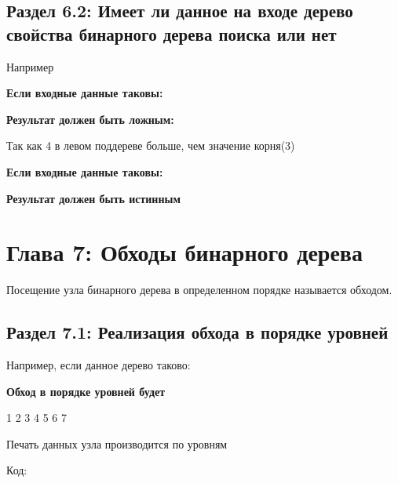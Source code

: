 
\section*{Раздел 6.2: Имеет ли данное на входе дерево свойства \newline бинарного дерева поиска или нет}

Например

\vspace{\baselineskip}
\textbf{Если входные данные таковы:}

\vspace{\baselineskip}
\vspace{-0.3cm}

\textbf{Результат должен быть ложным:}

\vspace{\baselineskip}
Так как 4 в левом поддереве больше, чем значение корня(3)

\vspace{\baselineskip}
\textbf{Если входные данные таковы:}


\vspace{-0.5cm}
\textbf{Результат должен быть истинным}

\chapter*{Глава 7: Обходы бинарного дерева}
\vspace{-0.3cm}
Посещение узла бинарного дерева в определенном порядке называется обходом.

\vspace{\baselineskip}
\vspace{-0.4cm}
\section*{Раздел 7.1: Реализация обхода в порядке уровней}
Например, если данное дерево таково:


\textbf{Обход в порядке уровней будет}

\vspace{\baselineskip}
1 2 3 4 5 6 7

\vspace{\baselineskip}
Печать данных узла производится по уровням

\vspace{\baselineskip}
Код:

